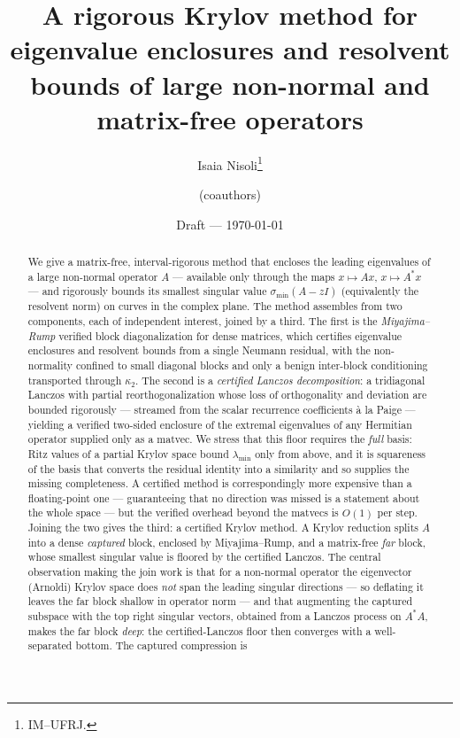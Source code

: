 \documentclass[11pt]{article}
\title{A rigorous Krylov method for eigenvalue enclosures and resolvent bounds
of large non-normal and matrix-free operators}
\author{%
  Isaia Nisoli\thanks{IM--UFRJ.}
  \and (coauthors)}
\date{Draft --- \today}
\newcommand{\sigmin}{\sigma_{\min}}
\begin{document}
\maketitle

\begin{abstract}
We give a matrix-free, interval-rigorous method that encloses the leading eigenvalues of a
large non-normal operator $A$ --- available only through the maps $x\mapsto Ax$, $x\mapsto A^*x$
--- and rigorously bounds its smallest singular value $\sigmin(A-zI)$ (equivalently the resolvent
norm) on curves in the complex plane. The method assembles from two components, each of independent
interest, joined by a third. The first is the \emph{Miyajima--Rump} verified block diagonalization
for dense matrices, which certifies eigenvalue enclosures and resolvent bounds from a single Neumann
residual, with the non-normality confined to small diagonal blocks and only a benign inter-block
conditioning transported through $\kappa_2$. The second is a \emph{certified Lanczos decomposition}:
a tridiagonal Lanczos with partial reorthogonalization whose loss of orthogonality and deviation are
bounded rigorously --- streamed from the scalar recurrence coefficients \`a la Paige --- yielding a
verified two-sided enclosure of the extremal eigenvalues of any Hermitian operator supplied only as a
matvec. We stress that this floor requires the \emph{full} basis: Ritz values of a partial Krylov space
bound $\lambda_{\min}$ only from above, and it is squareness of the basis that converts the residual
identity into a similarity and so supplies the missing completeness. A certified method is
correspondingly more expensive than a floating-point one --- guaranteeing that no direction was missed
is a statement about the whole space --- but the verified overhead beyond the matvecs is $O(1)$ per step. Joining the two gives the third: a certified Krylov
method. A Krylov reduction splits $A$ into a dense \emph{captured} block, enclosed by Miyajima--Rump,
and a matrix-free \emph{far} block, whose smallest singular value is floored by the certified Lanczos.
The central observation making the join work is that for a non-normal operator the eigenvector
(Arnoldi) Krylov space does \emph{not} span the leading singular directions --- so deflating it leaves
the far block shallow in operator norm --- and that augmenting the captured subspace with the top right
singular vectors, obtained from a Lanczos process on $A^*A$, makes the far block \emph{deep}: the
certified-Lanczos floor then converges with a well-separated bottom. The captured compression is

\end{abstract}
\end{document}
